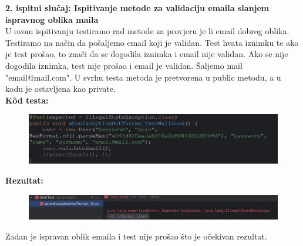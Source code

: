 \noindent \textbf{2. ispitni slučaj: Ispitivanje metode za validaciju emaila slanjem ispravnog oblika maila}\\
U ovom ispitivanju testiramo rad metode za provjeru je li email dobrog oblika. Testiramo na način da pošaljemo email koji je validan. Test hvata iznimku te ako je test prošao, to znači da se dogodila iznimka i email nije validan. Ako se nije dogodila iznimka, test nije prošao i email je validan. Šaljemo mail "email@mail.com". U svrhu testa metoda je pretvorena u public metodu, a u kodu je ostavljena kao private. \\
\textbf{Kôd testa:}
\begin{figure}[H]
	\includegraphics[scale=0.5]{slike/kodTesta2.PNG} %
	\centering
\end{figure}
\noindent \textbf{Rezultat:}
\begin{figure}[H]
	\includegraphics[scale=0.6]{slike/test2.PNG} %
	\centering
\end{figure}
\noindent Zadan je ispravan oblik emaila i test nije prošao što je očekivan rezultat. \\


